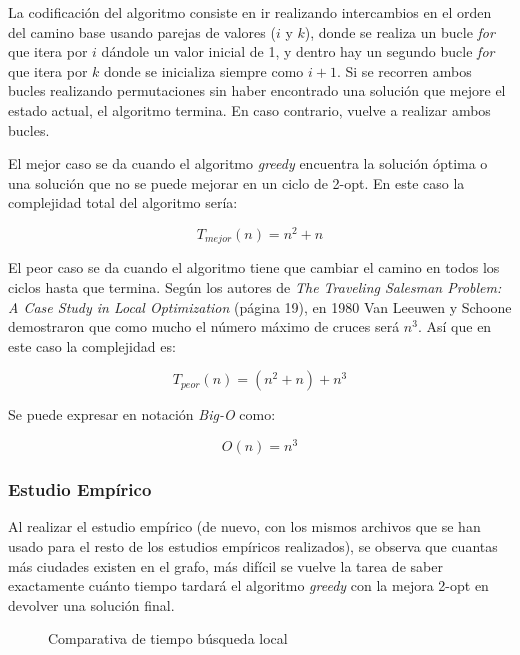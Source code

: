 \documentclass{uc3mpracticas}
\begin{document}
  \vspace{2mm}

  La codificación del algoritmo consiste en ir realizando intercambios en el orden del camino base usando parejas de valores ($i$ y $k$), donde se realiza un bucle \textit{for} que itera por $i$ dándole un valor inicial de 1, y dentro hay un segundo bucle \textit{for} que itera por $k$ donde se inicializa siempre como $i+1$. Si se recorren ambos bucles realizando permutaciones sin haber encontrado una solución que mejore el estado actual, el algoritmo termina. En caso contrario, vuelve a realizar ambos bucles.

  \vspace{2mm}


  El mejor caso se da cuando el algoritmo \textit{greedy} encuentra la solución óptima o una solución que no se puede mejorar en un ciclo de 2-opt. En este caso la complejidad total del algoritmo sería:

  $$T_{mejor}(n) = n^2 +n$$

  El peor caso se da cuando el algoritmo tiene que cambiar el camino en todos los ciclos hasta que termina. Según los autores de \textit{The Traveling Salesman Problem: A Case Study in Local Optimization} \cite{tsp} (página 19), en 1980 Van Leeuwen y Schoone demostraron que como mucho el número máximo de cruces será $n^3$. Así que en este caso la complejidad es:

  $$T_{peor}(n) = (n^2 +n) + n^3$$

  Se puede expresar en notación \textit{Big-O} como:

  $$O(n) = n^3$$




  \subsubsection{Estudio Empírico}

  Al realizar el estudio empírico (de nuevo, con los mismos archivos que se han usado para el resto de los estudios empíricos realizados), se observa que cuantas más ciudades existen en el grafo, más difícil se vuelve la tarea de saber exactamente cuánto tiempo tardará el algoritmo \textit{greedy} con la mejora 2-opt en devolver una solución final.

  \begin{figure}[!h]
    \caption{Comparativa de tiempo búsqueda local}
    \label{fig:compLocal}
  \end{figure}
\end{document}
